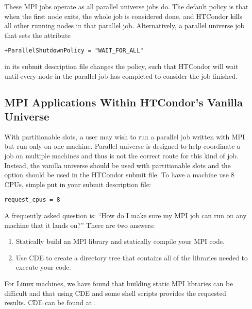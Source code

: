These MPI jobs operate as all parallel universe jobs do.
The default policy is that when the first node exits,
the whole job is considered done, 
and HTCondor kills all other running nodes in that parallel job.
Alternatively, a parallel universe job that sets the attribute
\begin{verbatim}
+ParallelShutdownPolicy = "WAIT_FOR_ALL"
\end{verbatim}
in its submit description file changes the policy,
such that HTCondor will wait until every node in the parallel 
job has completed to consider the job finished. 


\subsection{\label{sec:parallel-mpi-submit-single}MPI Applications Within HTCondor's Vanilla Universe}

With partitionable slots, a user may wish to run a parallel job written with
MPI but run only on one machine. Parallel universe is designed to help 
coordinate a job on multiple machines and thus is not the correct route for
this kind of job. Instead, the vanilla universe should be used with partitionable
slots and the  option should be used in the HTCondor submit
file. To have a machine use 8 CPUs, simple put in your submit description file:

\begin{verbatim}
request_cpus = 8
\end{verbatim}

A frequently asked question is: ``How do I make sure my MPI job can run 
on any machine that it lands on?'' There are two answers:
\begin{enumerate}
\item Statically build an MPI library and statically compile your MPI code.
\item Use CDE to create a directory tree that contains all of the libraries 
needed to execute your code.
\end{enumerate}

For Linux machines, we have found that building static MPI libraries can be 
difficult and that 
using CDE and some shell scripts provides the requested results. CDE can be
found at .

